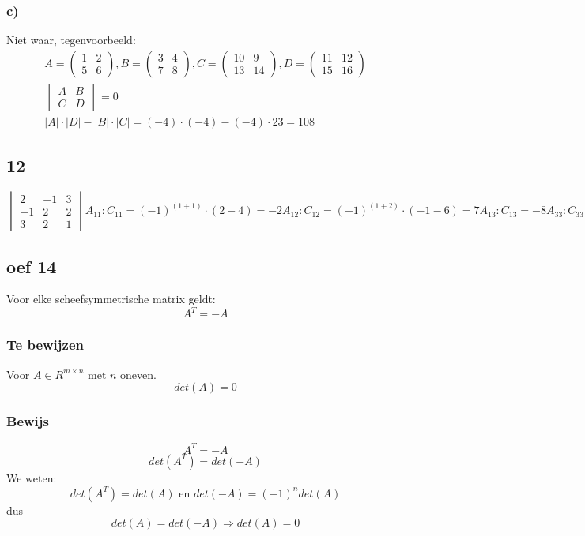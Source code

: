 \documentclass[10pt,a4paper]{article}
\begin{document}
\subsubsection*{c)}
Niet waar, tegenvoorbeeld:
\begin{gather*}
    A = 
    \begin{pmatrix}
        1 & 2\\
        5 & 6
    \end{pmatrix} 
    , B = 
    \begin{pmatrix}
        3 & 4\\
        7 & 8
    \end{pmatrix}
    , C = 
    \begin{pmatrix}
        10 & 9\\
        13 & 14
    \end{pmatrix}
    , D = 
    \begin{pmatrix}
        11 & 12\\
        15 & 16
    \end{pmatrix}\\
    \begin{vmatrix}
        A & B\\
        C & D
    \end{vmatrix}
    = 0\\
    |A| \cdot |D| - |B| \cdot |C| = (-4) \cdot (-4) - (-4) \cdot 23 = 108
\end{gather*}


\subsection*{12}
\[
\begin{vmatrix}
2 & -1 & 3\\
-1 & 2 & 2\\
3 & 2 & 1
\end{vmatrix}
A_{11} : C_{11} = (-1)^(1+1) \cdot (2 - 4) = -2
A_{12} : C_{12} = (-1)^(1+2) \cdot (-1 -6) = 7
A_{13} : C_{13} = -8
A_{33} : C_{33} = 2
\]

\subsection*{oef 14}
Voor elke scheefsymmetrische matrix geldt:
\[
A^T= -A
\]
\subsubsection*{Te bewijzen}
Voor $A\in R^{m\times n}$ met $n$ oneven.
\[
det(A) = 0
\]
\subsubsection*{Bewijs}
\[
A^T = -A
\]
\[
det(A^T) = det(-A)
\]
We weten:
\[
det(A^T) = det(A) \text{ en } det(-A) = (-1)^n det(A)
\]
dus
\[
det(A) = det(-A) \Rightarrow det(A) = 0
\]
\end{document}
